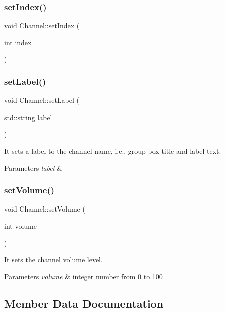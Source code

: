 \subsubsection{set\+Index()}
{\footnotesize\ttfamily void Channel\+::set\+Index (\begin{DoxyParamCaption}\item[{int}]{index }\end{DoxyParamCaption})}

\mbox{\label{class_channel_a1d0ac75e7416c18c3695de418e9137e1}} 
\subsubsection{set\+Label()}
{\footnotesize\ttfamily void Channel\+::set\+Label (\begin{DoxyParamCaption}\item[{std\+::string}]{label }\end{DoxyParamCaption})}



It sets a label to the channel name, i.\+e., group box title and label text. 


\begin{DoxyParams}{Parameters}
{\em label} & \\
\hline
\end{DoxyParams}
\mbox{\label{class_channel_a381d4ad81038cb9bcf393fa47b13cdb0}} 
\subsubsection{set\+Volume()}
{\footnotesize\ttfamily void Channel\+::set\+Volume (\begin{DoxyParamCaption}\item[{int}]{volume }\end{DoxyParamCaption})}



It sets the channel volume level. 


\begin{DoxyParams}{Parameters}
{\em volume} & integer number from 0 to 100 \\
\hline
\end{DoxyParams}


\subsection{Member Data Documentation}
\mbox{\label{class_channel_a7c8a0b25848ab487c39a803785f7ed21}} 
